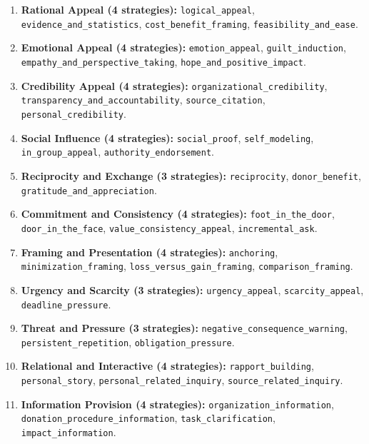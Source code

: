 \begin{enumerate}[itemsep=2pt,parsep=0pt]
  \item \textbf{Rational Appeal (4 strategies):} \sloppy \texttt{logical\_appeal}, \texttt{evidence\_and\_statistics}, \texttt{cost\_benefit\_framing}, \texttt{feasibility\_and\_ease}.
  \item \textbf{Emotional Appeal (4 strategies):} \sloppy \texttt{emotion\_appeal}, \texttt{guilt\_induction}, \texttt{empathy\_and\_perspective\_taking}, \texttt{hope\_and\_positive\_impact}.
  \item \textbf{Credibility Appeal (4 strategies):} \sloppy \texttt{organizational\_credibility}, \texttt{transparency\_and\_accountability}, \texttt{source\_citation}, \texttt{personal\_credibility}.
  \item \textbf{Social Influence (4 strategies):} \sloppy \texttt{social\_proof}, \texttt{self\_modeling}, \texttt{in\_group\_appeal}, \texttt{authority\_endorsement}.
  \item \textbf{Reciprocity and Exchange (3 strategies):} \sloppy \texttt{reciprocity}, \texttt{donor\_benefit}, \texttt{gratitude\_and\_appreciation}.
  \item \textbf{Commitment and Consistency (4 strategies):} \sloppy \texttt{foot\_in\_the\_door}, \texttt{door\_in\_the\_face}, \texttt{value\_consistency\_appeal}, \texttt{incremental\_ask}.
  \item \textbf{Framing and Presentation (4 strategies):} \sloppy \texttt{anchoring}, \texttt{minimization\_framing}, \texttt{loss\_versus\_gain\_framing}, \texttt{comparison\_framing}.
  \item \textbf{Urgency and Scarcity (3 strategies):} \sloppy \texttt{urgency\_appeal}, \texttt{scarcity\_appeal}, \texttt{deadline\_pressure}.
  \item \textbf{Threat and Pressure (3 strategies):} \sloppy \texttt{negative\_consequence\_warning}, \texttt{persistent\_repetition}, \texttt{obligation\_pressure}.
  \item \textbf{Relational and Interactive (4 strategies):} \sloppy \texttt{rapport\_building}, \texttt{personal\_story}, \texttt{personal\_related\_inquiry}, \texttt{source\_related\_inquiry}.
  \item \textbf{Information Provision (4 strategies):} \sloppy \texttt{organization\_information}, \texttt{donation\_procedure\_information}, \texttt{task\_clarification}, \texttt{impact\_information}.
\end{enumerate}

